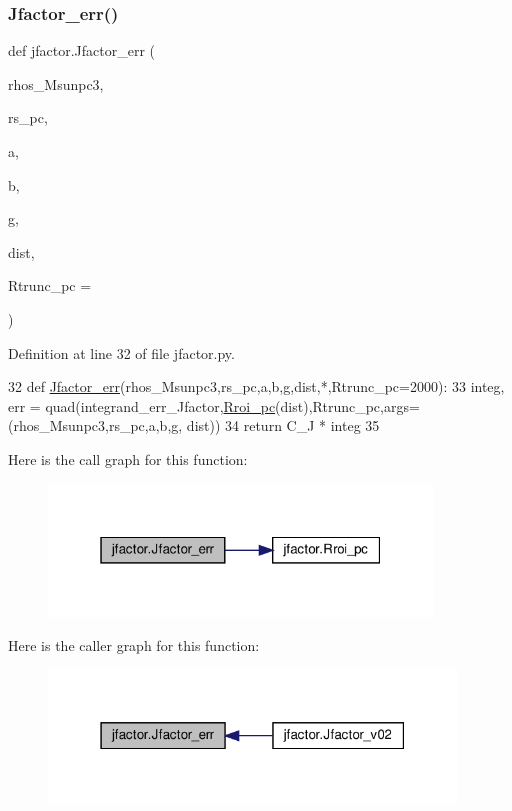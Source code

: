\subsubsection{\texorpdfstring{Jfactor\+\_\+err()}{Jfactor\_err()}}
{\footnotesize\ttfamily def jfactor.\+Jfactor\+\_\+err (\begin{DoxyParamCaption}\item[{}]{rhos\+\_\+\+Msunpc3,  }\item[{}]{rs\+\_\+pc,  }\item[{}]{a,  }\item[{}]{b,  }\item[{}]{g,  }\item[{}]{dist,  }\item[{}]{Rtrunc\+\_\+pc = {} }\end{DoxyParamCaption})}



Definition at line 32 of file jfactor.\+py.


\begin{DoxyCode}
32 \textcolor{keyword}{def }\hyperlink{namespacejfactor_ad8b8ed7dec1d2c3b4432d37e53117f03}{Jfactor\_err}(rhos\_Msunpc3,rs\_pc,a,b,g,dist,*,Rtrunc\_pc=2000):
33     integ, err = quad(integrand\_err\_Jfactor,\hyperlink{namespacejfactor_ae5aad7f2ac90b82740c027677d7f4ac7}{Rroi\_pc}(dist),Rtrunc\_pc,args=(rhos\_Msunpc3,rs\_pc,a,b,g,
      dist))
34     \textcolor{keywordflow}{return} C\_J * integ
35 
\end{DoxyCode}
Here is the call graph for this function\+:\nopagebreak
\begin{figure}[H]
\begin{center}
\leavevmode
\includegraphics[width=289pt]{de/d47/namespacejfactor_ad8b8ed7dec1d2c3b4432d37e53117f03_cgraph}
\end{center}
\end{figure}
Here is the caller graph for this function\+:\nopagebreak
\begin{figure}[H]
\begin{center}
\leavevmode
\includegraphics[width=307pt]{de/d47/namespacejfactor_ad8b8ed7dec1d2c3b4432d37e53117f03_icgraph}
\end{center}
\end{figure}
\mbox{\label{namespacejfactor_a4d9eb98f6dca866cd6248ef6b1c308a5}} 
